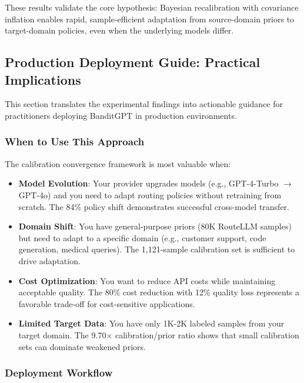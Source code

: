 These results validate the core hypothesis: Bayesian recalibration with covariance inflation enables rapid, sample-efficient adaptation from source-domain priors to target-domain policies, even when the underlying models differ.

\subsection{Production Deployment Guide: Practical Implications}

This section translates the experimental findings into actionable guidance for practitioners deploying BanditGPT in production environments.

\subsubsection{When to Use This Approach}

The calibration convergence framework is most valuable when:

\begin{itemize}
    \item \textbf{Model Evolution}: Your provider upgrades models (e.g., GPT-4-Turbo $\rightarrow$ GPT-4o) and you need to adapt routing policies without retraining from scratch. The 84\% policy shift demonstrates successful cross-model transfer.
    
    \item \textbf{Domain Shift}: You have general-purpose priors (80K RouteLLM samples) but need to adapt to a specific domain (e.g., customer support, code generation, medical queries). The 1,121-sample calibration set is sufficient to drive adaptation.
    
    \item \textbf{Cost Optimization}: You want to reduce API costs while maintaining acceptable quality. The 80\% cost reduction with 12\% quality loss represents a favorable trade-off for cost-sensitive applications.
    
    \item \textbf{Limited Target Data}: You have only 1K-2K labeled samples from your target domain. The 9.70× calibration/prior ratio shows that small calibration sets can dominate weakened priors.
\end{itemize}

\subsubsection{Deployment Workflow}

